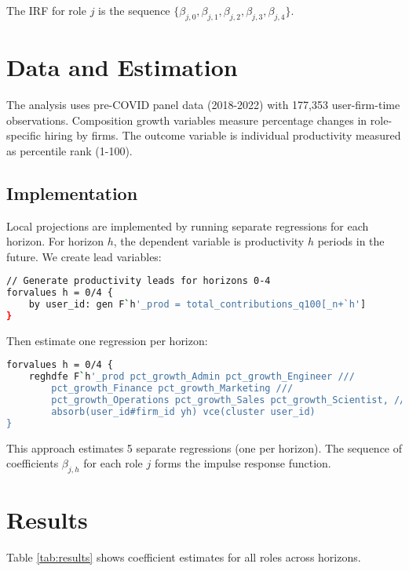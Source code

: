 \documentclass[11pt]{article}
\begin{document}
The IRF for role $j$ is the sequence $\{\beta_{j,0}, \beta_{j,1}, \beta_{j,2}, \beta_{j,3}, \beta_{j,4}\}$.


\section{Data and Estimation}

The analysis uses pre-COVID panel data (2018-2022) with 177,353 user-firm-time observations. Composition growth variables measure percentage changes in role-specific hiring by firms. The outcome variable is individual productivity measured as percentile rank (1-100).

\subsection{Implementation}

Local projections are implemented by running separate regressions for each horizon. For horizon $h$, the dependent variable is productivity $h$ periods in the future. We create lead variables:

\begin{lstlisting}[language=bash, caption=Creating Lead Variables]
// Generate productivity leads for horizons 0-4
forvalues h = 0/4 {
    by user_id: gen F`h'_prod = total_contributions_q100[_n+`h']
}
\end{lstlisting}

Then estimate one regression per horizon:

\begin{lstlisting}[language=bash, caption=Local Projections Estimation]
forvalues h = 0/4 {
    reghdfe F`h'_prod pct_growth_Admin pct_growth_Engineer ///
        pct_growth_Finance pct_growth_Marketing ///
        pct_growth_Operations pct_growth_Sales pct_growth_Scientist, ///
        absorb(user_id#firm_id yh) vce(cluster user_id)
}
\end{lstlisting}

This approach estimates 5 separate regressions (one per horizon). The sequence of coefficients $\beta_{j,h}$ for each role $j$ forms the impulse response function.


\section{Results}

Table \ref{tab:results} shows coefficient estimates for all roles across horizons.
\end{document}
